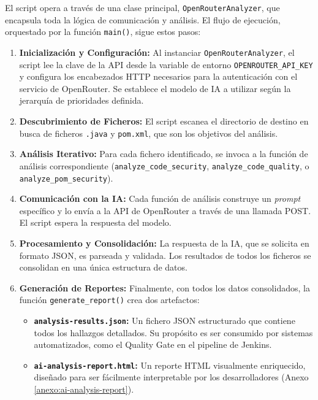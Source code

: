 El script opera a través de una clase principal, \texttt{OpenRouterAnalyzer}, que encapsula toda la lógica de comunicación y análisis. El flujo de ejecución, orquestado por la función \texttt{main()}, sigue estos pasos:

\begin{enumerate}
    \item \textbf{Inicialización y Configuración:} Al instanciar \texttt{OpenRouterAnalyzer}, el script lee la clave de la API desde la variable de entorno \texttt{OPENROUTER\_API\_KEY} y configura los encabezados HTTP necesarios para la autenticación con el servicio de OpenRouter. Se establece el modelo de IA a utilizar según la jerarquía de prioridades definida.
    \item \textbf{Descubrimiento de Ficheros:} El script escanea el directorio de destino en busca de ficheros \texttt{.java} y \texttt{pom.xml}, que son los objetivos del análisis.
    \item \textbf{Análisis Iterativo:} Para cada fichero identificado, se invoca a la función de análisis correspondiente (\texttt{analyze\_code\_security}, \texttt{analyze\_code\_quality}, o \texttt{analyze\_pom\_security}).
    \item \textbf{Comunicación con la IA:} Cada función de análisis construye un \textit{prompt} específico y lo envía a la API de OpenRouter a través de una llamada POST. El script espera la respuesta del modelo.
    \item \textbf{Procesamiento y Consolidación:} La respuesta de la IA, que se solicita en formato JSON, es parseada y validada. Los resultados de todos los ficheros se consolidan en una única estructura de datos.
    \item \textbf{Generación de Reportes:} Finalmente, con todos los datos consolidados, la función \texttt{generate\_\linebreak report()} crea dos artefactos:
    \begin{itemize}
        \item \textbf{\texttt{analysis-results.json}:} Un fichero JSON estructurado que contiene todos los hallazgos detallados. Su propósito es ser consumido por sistemas automatizados, como el Quality Gate en el pipeline de Jenkins.
        \item \textbf{\texttt{ai-analysis-report.html}:} Un reporte HTML visualmente enriquecido, diseñado para ser fácilmente interpretable por los desarrolladores (Anexo \ref{anexo:ai-analysis-report}).
    \end{itemize}
\end{enumerate}

